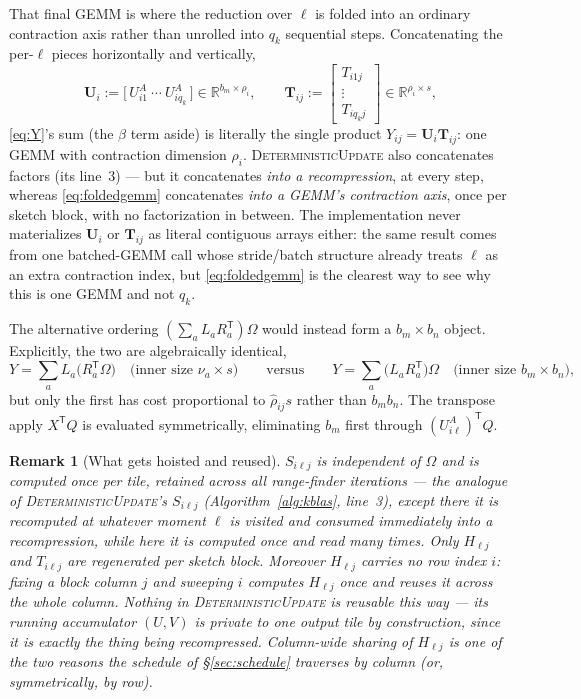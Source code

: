 \documentclass[11pt]{article}
\newtheorem{remark}{Remark}
\newcommand{\R}{\mathbb{R}}
\newcommand{\T}{\mathsf{T}}
\begin{document}
That final GEMM is where the reduction over $\ell$ is folded into an ordinary
contraction axis rather than unrolled into $q_k$ sequential steps.
Concatenating the per-$\ell$ pieces horizontally and vertically,
\begin{equation}
\label{eq:foldedgemm}
\mathbf U_i:=\bigl[\,U^A_{i1}\ \cdots\ U^A_{iq_k}\,\bigr]\in\R^{b_m\times\rho_i},
\qquad
\mathbf T_{ij}:=\begin{bmatrix}T_{i1j}\\\vdots\\T_{iq_kj}\end{bmatrix}
\in\R^{\rho_i\times s},
\end{equation}
\eqref{eq:Y}'s sum (the $\beta$ term aside) is literally the single product
$Y_{ij}=\mathbf U_i\mathbf T_{ij}$: one GEMM with contraction dimension
$\rho_i$. \textsc{DeterministicUpdate} also concatenates factors (its
line~3) --- but it concatenates \emph{into a recompression}, at every step,
whereas \eqref{eq:foldedgemm} concatenates \emph{into a GEMM's contraction
axis}, once per sketch block, with no factorization in between. The
implementation never materializes $\mathbf U_i$ or $\mathbf T_{ij}$ as literal
contiguous arrays either: the same result comes from one batched-GEMM call
whose stride/batch structure already treats $\ell$ as an extra contraction
index, but \eqref{eq:foldedgemm} is the clearest way to see why this is one
GEMM and not $q_k$.

The alternative ordering $(\sum_aL_aR_a^{\T})\Omega$ would instead form a
$b_m\times b_n$ object. Explicitly, the two are algebraically identical,
\[
Y=\sum_a L_a\bigl(R_a^{\T}\Omega\bigr)
\quad\text{(inner size }\nu_a\times s)\qquad\text{versus}\qquad
Y=\sum_a\bigl(L_aR_a^{\T}\bigr)\Omega
\quad\text{(inner size }b_m\times b_n),
\]
but only the first has cost proportional to $\hat\rho_{ij}s$ rather than
$b_mb_n$. The transpose apply $X^{\T}Q$ is evaluated symmetrically,
eliminating $b_m$ first through $(U^A_{i\ell})^{\T}Q$.

\begin{remark}[What gets hoisted and reused]
\label{rem:hoist}
$S_{i\ell j}$ is independent of $\Omega$ and is computed once per tile,
retained across all range-finder iterations --- the analogue of
\textsc{DeterministicUpdate}'s $S_{i\ell j}$ (Algorithm~\ref{alg:kblas},
line~3), except there it is recomputed at whatever moment $\ell$ is visited
and consumed immediately into a recompression, while here it is computed once
and read many times. Only $H_{\ell j}$ and $T_{i\ell j}$ are regenerated per
sketch block. Moreover $H_{\ell j}$ carries no row index $i$: fixing a block
column $j$ and sweeping $i$ computes $H_{\ell j}$ once and reuses it across
the whole column. Nothing in \textsc{DeterministicUpdate} is reusable this
way --- its running accumulator $(U,V)$ is private to one output tile by
construction, since it is exactly the thing being recompressed. Column-wide
sharing of $H_{\ell j}$ is one of the two reasons the schedule of
\S\ref{sec:schedule} traverses by column (or, symmetrically, by row).
\end{remark}
\end{document}
